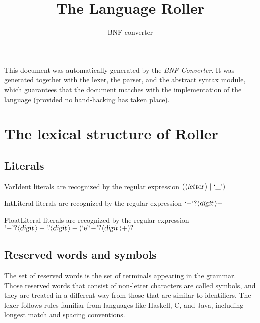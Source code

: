 \documentclass[a4paper,11pt]{article}
\author{BNF-converter}
\title{The Language Roller}
\begin{document}
\maketitle

\newcommand{\emptyP}{\mbox{$\epsilon$}}
\newcommand{\terminal}[1]{\mbox{{\texttt {#1}}}}
\newcommand{\nonterminal}[1]{\mbox{$\langle \mbox{{\sl #1 }} \! \rangle$}}
\newcommand{\arrow}{\mbox{::=}}
\newcommand{\delimit}{\mbox{$|$}}
\newcommand{\reserved}[1]{\mbox{{\texttt {#1}}}}
\newcommand{\literal}[1]{\mbox{{\texttt {#1}}}}
\newcommand{\symb}[1]{\mbox{{\texttt {#1}}}}

This document was automatically generated by the {\em BNF-Converter}. It was generated together with the lexer, the parser, and the abstract syntax module, which guarantees that the document matches with the implementation of the language (provided no hand-hacking has taken place).

\section*{The lexical structure of Roller}

\subsection*{Literals}





VarIdent literals are recognized by the regular expression
\(({\nonterminal{letter}} \mid \mbox{`\_'})+\)

IntLiteral literals are recognized by the regular expression
\(\mbox{`{$-$}'}? {\nonterminal{digit}}+\)

FloatLiteral literals are recognized by the regular expression
\(\mbox{`{$-$}'}? {\nonterminal{digit}}+ \mbox{`.'} {\nonterminal{digit}}+ (\mbox{`e'} \mbox{`{$-$}'}? {\nonterminal{digit}}+)?\)


\subsection*{Reserved words and symbols}
The set of reserved words is the set of terminals appearing in the grammar. Those reserved words that consist of non-letter characters are called symbols, and they are treated in a different way from those that are similar to identifiers. The lexer follows rules familiar from languages like Haskell, C, and Java, including longest match and spacing conventions.
\end{document}
